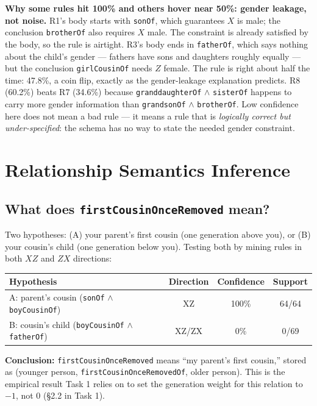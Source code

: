 \documentclass[11pt,a4paper]{article}
\newcommand{\rel}[1]{\texttt{\small #1}}
\begin{document}
\textbf{Why some rules hit 100\% and others hover near 50\%: gender
leakage, not noise.} R1's body starts with \rel{sonOf}, which guarantees
$X$ is male; the conclusion \rel{brotherOf} also requires $X$ male. The
constraint is already satisfied by the body, so the rule is airtight.
R3's body ends in \rel{fatherOf}, which says nothing about the child's
gender --- fathers have sons and daughters roughly equally --- but the
conclusion \rel{girlCousinOf} needs $Z$ female. The rule is right about
half the time: 47.8\%, a coin flip, exactly as the gender-leakage
explanation predicts. R8 (60.2\%) beats R7 (34.6\%) because
\rel{granddaughterOf} $\wedge$ \rel{sisterOf} happens to carry more
gender information than \rel{grandsonOf} $\wedge$ \rel{brotherOf}. Low
confidence here does not mean a bad rule --- it means a rule that is
\emph{logically correct but under-specified}: the schema has no way to
state the needed gender constraint.

\section{Relationship Semantics Inference}

\subsection{What does \texttt{firstCousinOnceRemoved} mean?}

Two hypotheses: (A) your parent's first cousin (one generation above
you), or (B) your cousin's child (one generation below you). Testing both
by mining rules in both $XZ$ and $ZX$ directions:

\begin{center}
\begin{tabular}{lccc}
\toprule
\textbf{Hypothesis} & \textbf{Direction} & \textbf{Confidence} & \textbf{Support} \\
\midrule
A: parent's cousin (\rel{sonOf} $\wedge$ \rel{boyCousinOf}) & XZ & 100\% & 64/64 \\
B: cousin's child (\rel{boyCousinOf} $\wedge$ \rel{fatherOf}) & XZ/ZX & 0\% & 0/69 \\
\bottomrule
\end{tabular}
\end{center}

\textbf{Conclusion:} \rel{firstCousinOnceRemoved} means ``my parent's
first cousin,'' stored as (younger person, \rel{firstCousinOnceRemovedOf},
older person). This is the empirical result Task 1 relies on to set the
generation weight for this relation to $-1$, not $0$ (\S2.2 in Task 1).
\end{document}
